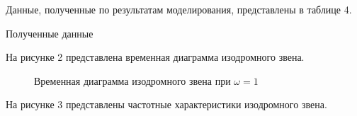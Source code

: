 \documentclass[a4paper, 11pt]{article}
\begin{document}
\par 
Данные, полученные по результатам моделирования, представлены в таблице 4.

\newpage
\begin{table}[h!]
    \begin{threeparttable}
        \caption{Полученные данные} \label{tab:perflogcross}
    \end{threeparttable}
\end{table}

На рисунке 2 представлена временная диаграмма изодромного звена.
\begin{figure}
	\centering
	\caption{Временная диаграмма изодромного звена при $\omega = 1$}
\end{figure}
\newpage
\par 
На рисунке 3 представлены частотные характеристики изодромного звена.
\end{document}

